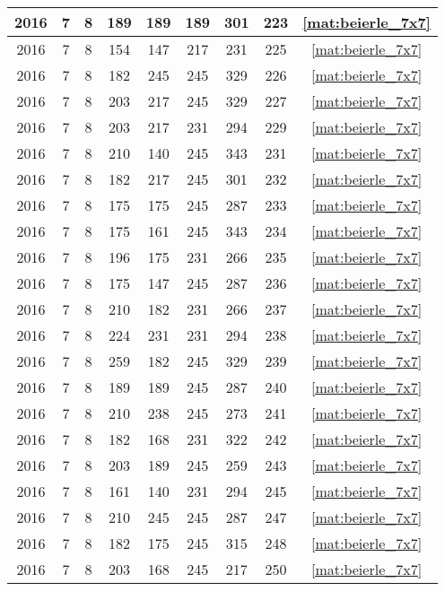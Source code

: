 \begin{longtable}{|c|c|c|c|c|c|c|c|c|}
2016 & 7 & 8 & 189 & 189 & 189 & 301 & 223 & \eqref{mat:beierle_7x7} \\ \hline 
2016 & 7 & 8 & 154 & 147 & 217 & 231 & 225 & \eqref{mat:beierle_7x7} \\ \hline 
2016 & 7 & 8 & 182 & 245 & 245 & 329 & 226 & \eqref{mat:beierle_7x7} \\ \hline 
2016 & 7 & 8 & 203 & 217 & 245 & 329 & 227 & \eqref{mat:beierle_7x7} \\ \hline 
2016 & 7 & 8 & 203 & 217 & 231 & 294 & 229 & \eqref{mat:beierle_7x7} \\ \hline 
2016 & 7 & 8 & 210 & 140 & 245 & 343 & 231 & \eqref{mat:beierle_7x7} \\ \hline 
2016 & 7 & 8 & 182 & 217 & 245 & 301 & 232 & \eqref{mat:beierle_7x7} \\ \hline 
2016 & 7 & 8 & 175 & 175 & 245 & 287 & 233 & \eqref{mat:beierle_7x7} \\ \hline 
2016 & 7 & 8 & 175 & 161 & 245 & 343 & 234 & \eqref{mat:beierle_7x7} \\ \hline 
2016 & 7 & 8 & 196 & 175 & 231 & 266 & 235 & \eqref{mat:beierle_7x7} \\ \hline 
2016 & 7 & 8 & 175 & 147 & 245 & 287 & 236 & \eqref{mat:beierle_7x7} \\ \hline 
2016 & 7 & 8 & 210 & 182 & 231 & 266 & 237 & \eqref{mat:beierle_7x7} \\ \hline 
2016 & 7 & 8 & 224 & 231 & 231 & 294 & 238 & \eqref{mat:beierle_7x7} \\ \hline 
2016 & 7 & 8 & 259 & 182 & 245 & 329 & 239 & \eqref{mat:beierle_7x7} \\ \hline 
2016 & 7 & 8 & 189 & 189 & 245 & 287 & 240 & \eqref{mat:beierle_7x7} \\ \hline 
2016 & 7 & 8 & 210 & 238 & 245 & 273 & 241 & \eqref{mat:beierle_7x7} \\ \hline 
2016 & 7 & 8 & 182 & 168 & 231 & 322 & 242 & \eqref{mat:beierle_7x7} \\ \hline 
2016 & 7 & 8 & 203 & 189 & 245 & 259 & 243 & \eqref{mat:beierle_7x7} \\ \hline 
2016 & 7 & 8 & 161 & 140 & 231 & 294 & 245 & \eqref{mat:beierle_7x7} \\ \hline 
2016 & 7 & 8 & 210 & 245 & 245 & 287 & 247 & \eqref{mat:beierle_7x7} \\ \hline 
2016 & 7 & 8 & 182 & 175 & 245 & 315 & 248 & \eqref{mat:beierle_7x7} \\ \hline 
2016 & 7 & 8 & 203 & 168 & 245 & 217 & 250 & \eqref{mat:beierle_7x7} \\ \hline 

\end{longtable}
